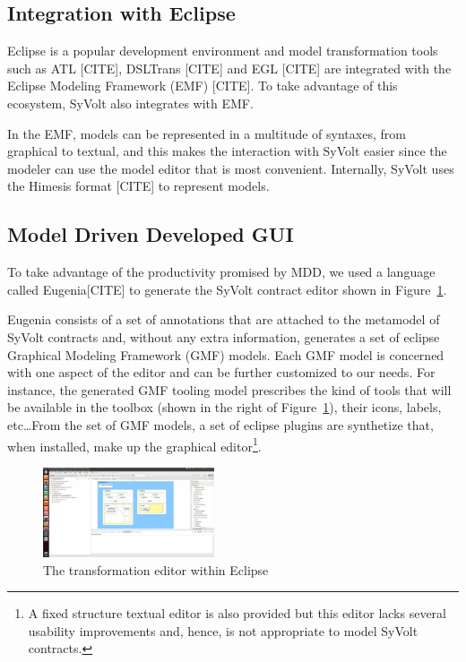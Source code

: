 \subsection{Integration with Eclipse}

Eclipse is a popular development environment and model transformation
tools such as ATL [CITE], DSLTrans [CITE] and EGL [CITE] are integrated with the
Eclipse Modeling Framework (EMF) [CITE].
To take advantage of this ecosystem, SyVolt also integrates with EMF.

In the EMF, models can be represented in a multitude of syntaxes, from graphical
to textual, and this makes the interaction with SyVolt easier since the modeler
can use the model editor that is most convenient. Internally, SyVolt uses 
the Himesis format [CITE] to represent models.

\subsection{Model Driven Developed GUI}

To take advantage of the productivity promised by MDD, we used a language called
Eugenia[CITE] to generate the SyVolt contract editor shown in
Figure~\ref{fig:eclipse_frontend}.

Eugenia consists of a set of annotations that are attached to the metamodel of
SyVolt contracts and, without any extra information, generates a set of eclipse
Graphical Modeling Framework (GMF) models.
Each GMF model is concerned with one aspect of the editor and can be further
customized to our needs.
For instance, the generated GMF tooling model prescribes the kind of tools that
will be available in the toolbox (shown in the right of
Figure~\ref{fig:eclipse_frontend}), their icons, labels, etc\ldots From the set
of GMF models, a set of eclipse plugins are synthetize that, when installed,
make up the graphical editor\footnote{A fixed structure textual editor is also provided but this editor lacks several usability improvements and, hence, is not appropriate to model SyVolt contracts.}.

\begin{figure}
\centering
\includegraphics[width=0.45\textwidth]{figures/eclipse_frontend}
\caption{The transformation editor within Eclipse}
\label{fig:eclipse_frontend}
\end{figure}

